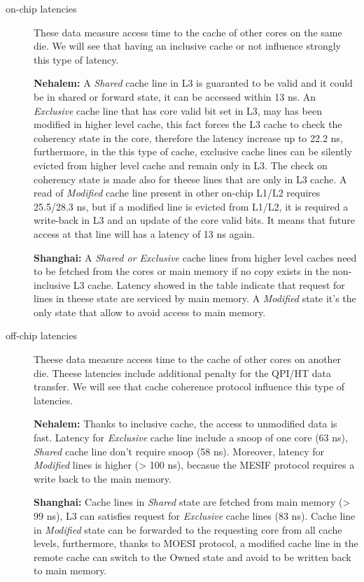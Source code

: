 \begin{description} %

\item[on-chip latencies] These data measure access time to the cache of other cores on the same die. We will see that having an inclusive cache or not
influence strongly this type of latency. 

\textbf{Nehalem:} A \textit{Shared} cache line in L3 is guaranted to be valid and it could be in shared or forward state, it can be accessed within 13 ns. 
An \textit{Exclusive} cache line that has core valid bit set in L3, may has been modified in higher level cache, this fact forces the L3 cache to check the 
coherency state in the core, therefore the latency increase up to 22.2 ns, furthermore, in the this type of cache, exclusive cache lines can be silently 
evicted from higher level cache and remain only in L3. The check on coherency state is made also for theese lines that are only in L3 cache.
A read of \textit{Modified} cache line present in other on-chip L1/L2 requires 25.5/28.3 ns, but if a modified line is evicted from L1/L2, it is required a 
write-back in L3 and an update of the core valid bits. It means that future access at that line will has a latency of 13 ns again.

\textbf{Shanghai:} A \textit{Shared or Exclusive} cache lines from higher level caches need to be fetched from the cores or main memory if no copy exists 
in the non-inclusive L3 cache. Latency showed in the table indicate that request for lines in theese state are serviced by main memory.
A \textit{Modified} state it's the only state that allow to avoid access to main memory.

\item[off-chip latencies] Theese data measure access time to the cache of other cores on another die. Theese latencies include additional penalty for the
QPI/HT data transfer. We will see that cache coherence protocol influence this type of latencies.

\textbf{Nehalem:} Thanks to inclusive cache, the access to unmodified data is fast. Latency for \textit{Exclusive} cache line include a snoop of one core 
(63 ns), \textit{Shared} cache line don't require snoop (58 ns). Moreover, latency for \textit{Modified} lines is higher (> 100 ns), becasue the MESIF 
protocol requires a write back to the main memory.

\textbf{Shanghai:} Cache lines in \textit{Shared} state are fetched from main memory (> 99 ns), L3 can satisfies request for \textit{Exclusive} cache lines 
(83 ns). Cache line in \textit{Modified} state can be forwarded to the requesting core from all cache levels, furthermore, thanks to MOESI protocol, a 
modified cache line in the remote cache can switch to the Owned state and avoid to be written back to main memory.

\end{description} %

